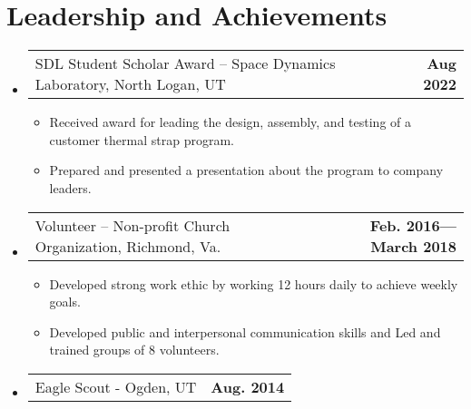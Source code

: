 \documentclass[letterpaper,11pt]{article}
\makeatletter
\newcommand{\resumeProjectHeading}[2]{
    \vspace{-6pt}
    \item
    \begin{tabular*}{1.0\textwidth}{l@{\extracolsep{\fill}}r}
      \small#1 & \textbf{\small #2}\\
    \end{tabular*}\vspace{-11pt}
}
\newcommand{\resumeSubHeadingListStart}{\begin{itemize}[leftmargin=0.0in, label={}]}
\newcommand{\resumeSubHeadingListEnd}{\end{itemize}}
\newcommand{\resumeItemListStart}{\begin{itemize}}
\newcommand{\resumeItemListEnd}{\end{itemize}\vspace{-5pt}}
\newcommand{\resumeItem}[1]{ 
  \item\small{
    {#1 \vspace{-4pt}}
  }
}
\makeatother
\begin{document}
\section{Leadership and Achievements }
    \resumeSubHeadingListStart{}
    \resumeProjectHeading{SDL Student Scholar Award – Space Dynamics Laboratory, North Logan, UT	}{Aug 2022}
      \resumeItemListStart{}
        \resumeItem{Received award for leading the design, assembly, and testing of a customer thermal strap program.}
        \resumeItem{Prepared and presented a presentation about the program to company leaders.}
      \resumeItemListEnd{}
    \resumeProjectHeading{Volunteer – Non-profit Church Organization, Richmond, Va.}{Feb. 2016—March 2018}
      \resumeItemListStart{}
        \resumeItem{Developed strong work ethic by working 12 hours daily to achieve weekly goals.}
        \resumeItem{Developed public and interpersonal communication skills and Led and trained groups of 8 volunteers.}
      \resumeItemListEnd{}
    \resumeProjectHeading{Eagle Scout - Ogden, UT}{Aug. 2014}
      \resumeItemListStart{}
      \resumeItemListEnd{}

    \resumeSubHeadingListEnd{}
\vspace{-16pt}
\end{document}
